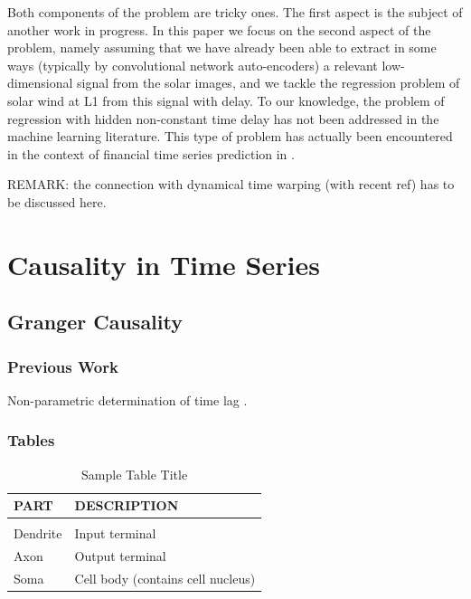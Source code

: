 \documentclass[twoside]{article}
\begin{document}
Both components of the problem are tricky ones. The first aspect is the subject of another work in progress. 
In this paper we focus on the second aspect of the problem, namely assuming that we have already been able to extract in some ways (typically by convolutional network auto-encoders) a relevant low-dimensional signal from the solar images, and we tackle the regression problem of solar wind at L1 from this signal with delay. To our knowledge, the problem of regression with hidden non-constant time delay has not been addressed in the machine learning literature. This type  of problem has actually been encountered in the context of financial time series prediction in \cite{ZHOU2006195}.

REMARK: the connection with dynamical time warping (with recent ref) has to 
be discussed here.

\section{Causality in Time Series}


\subsection{Granger Causality}


\subsubsection{Previous Work}

Non-parametric determination of time lag \cite{ZHOU2006195}.


\subsubsection{Tables}


\begin{table}[h]
\caption{Sample Table Title} \label{sample-table}
\begin{center}
\begin{tabular}{ll}
\textbf{PART}  &\textbf{DESCRIPTION} \\
\hline \\
Dendrite         &Input terminal \\
Axon             &Output terminal \\
Soma             &Cell body (contains cell nucleus) \\
\end{tabular}
\end{center}
\end{table}
\end{document}
